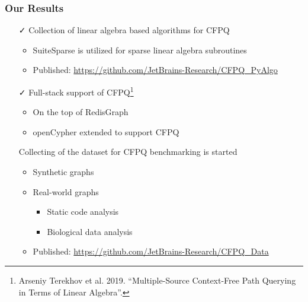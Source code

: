 \documentclass[xcolor=table,aspectratio=169]{beamer}
\begin{document}
\begin{frame}[fragile]
  \frametitle{Our Results}

  \begin{itemize}
    \item[\faCheck] Collection of linear algebra based algorithms for CFPQ
    \begin{itemize}
      \item SuiteSparse is utilized for sparse linear algebra subroutines
      \item Published: \url{https://github.com/JetBrains-Research/CFPQ_PyAlgo}
    \end{itemize}
    \pause
    \item[\faCheck] Full-stack support of CFPQ\footnote{Arseniy Terekhov et al. 2019. ``Multiple-Source Context-Free Path Querying in Terms of Linear Algebra''.}    
    \begin{itemize}
      \item On the top of RedisGraph
      \item openCypher extended to support CFPQ
    \end{itemize} 
    \pause 
    \item[\faGears] Collecting of the dataset for CFPQ benchmarking is started
    \begin{itemize}
      \item Synthetic graphs
      \item Real-world graphs
      \begin{itemize}
        \item Static code analysis
        \item Biological data analysis
      \end{itemize}
      \item Published: \url{https://github.com/JetBrains-Research/CFPQ_Data} 
    \end{itemize}     
  \end{itemize}

\end{frame}
\end{document}
